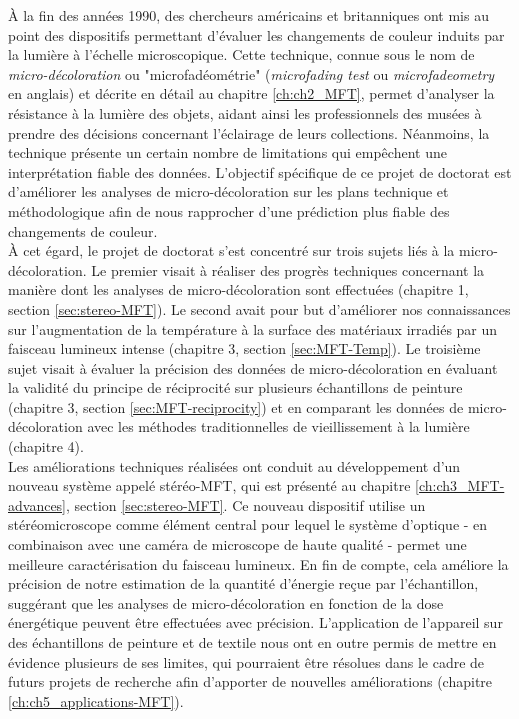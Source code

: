 À la fin des années 1990, des chercheurs américains et britanniques ont mis au point des dispositifs permettant d'évaluer les changements de couleur induits par la lumière à l'échelle microscopique. Cette technique, connue sous le nom de \textit{micro-décoloration} ou "microfadéométrie" (\textit{microfading test} ou \textit{microfadeometry} en anglais) et décrite en détail au chapitre \ref{ch:ch2_MFT}, permet d'analyser la résistance à la lumière des objets, aidant ainsi les professionnels des musées à prendre des décisions concernant l'éclairage de leurs collections. Néanmoins, la technique présente un certain nombre de limitations qui empêchent une interprétation fiable des données. L'objectif spécifique de ce projet de doctorat est d'améliorer les analyses de micro-décoloration sur les plans technique et méthodologique afin de nous rapprocher d'une prédiction plus fiable des changements de couleur. \\

À cet égard, le projet de doctorat s'est concentré sur trois sujets liés à la micro-décoloration. Le premier visait à réaliser des progrès techniques concernant la manière dont les analyses de micro-décoloration sont effectuées (chapitre 1, section \ref{sec:stereo-MFT}). Le second avait pour but d'améliorer nos connaissances sur l'augmentation de la température à la surface des matériaux irradiés par un faisceau lumineux intense (chapitre 3, section \ref{sec:MFT-Temp}). Le troisième sujet visait à évaluer la précision des données de micro-décoloration en évaluant la validité du principe de réciprocité sur plusieurs échantillons de peinture (chapitre 3, section \ref{sec:MFT-reciprocity}) et en comparant les données de micro-décoloration avec les méthodes traditionnelles de vieillissement à la lumière (chapitre 4). \\

Les améliorations techniques réalisées ont conduit au développement d'un nouveau système appelé stéréo-MFT, qui est présenté au chapitre \ref{ch:ch3_MFT-advances}, section \ref{sec:stereo-MFT}. Ce nouveau dispositif utilise un stéréomicroscope comme élément central pour lequel le système d'optique - en combinaison avec une caméra de microscope de haute qualité - permet une meilleure caractérisation du faisceau lumineux. En fin de compte, cela améliore la précision de notre estimation de la quantité d'énergie reçue par l'échantillon, suggérant que les analyses de micro-décoloration en fonction de la dose énergétique peuvent être effectuées avec précision. L'application de l'appareil sur des échantillons de peinture et de textile nous ont en outre permis de mettre en évidence plusieurs de ses limites, qui pourraient être résolues dans le cadre de futurs projets de recherche afin d'apporter de nouvelles améliorations (chapitre \ref{ch:ch5_applications-MFT}). \\

